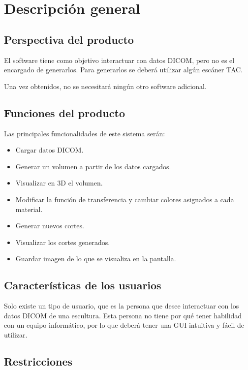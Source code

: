 \section{Descripción general}

\subsection{Perspectiva del producto}

	El software \myTitle tiene como objetivo interactuar con datos DICOM, pero no es el encargado de generarlos. Para generarlos se deberá utilizar algún escáner TAC.
	
	Una vez obtenidos, no se necesitará ningún otro software adicional.
	
	\subsection{Funciones del producto}
	
	Las principales funcionalidades de este sistema serán:
	\begin{itemize}
		\item Cargar datos DICOM.
		\item Generar un volumen a partir de los datos cargados.
		\item Visualizar en 3D el volumen.
		\item Modificar la función de transferencia y cambiar colores asignados a cada material.
		\item Generar nuevos cortes.
		\item Visualizar los cortes generados.
		\item Guardar imagen de lo que se visualiza en la pantalla.
	\end{itemize}
	
	\subsection{Características de los usuarios}
	
	Solo existe un tipo de usuario, que es la persona que desee interactuar con los datos DICOM de una escultura. Esta persona no tiene por qué tener habilidad con un equipo informático, por lo que \myTitle deberá tener una GUI intuitiva y fácil de utilizar.
	
	\subsection{Restricciones}
	
